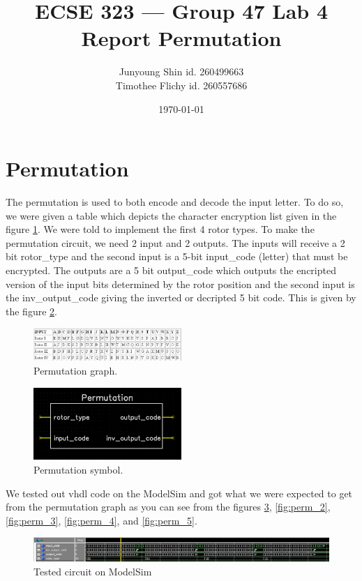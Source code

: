 \documentclass[10pt]{article}
\title{ECSE 323 --- Group 47 Lab 4 Report Permutation}
\author{Junyoung Shin id. 260499663\\ Timothee Flichy id. 260557686}
\date{\today}
\begin{document}
\maketitle
\section{Permutation}
The permutation is used to both encode and decode the input letter. To do so, we were given a table which depicts the character encryption list given in the figure \ref{fig:permuation}. We were told to implement the first 4 rotor types. To make the permutation circuit, we need 2 input and 2 outputs. The inputs will receive a 2 bit rotor\_type and the second input is a 5-bit input\_code (letter) that must be encrypted. The outputs are a 5 bit output\_code which outputs the encripted version of the input bits determined by the rotor position and the second input is the inv\_output\_code giving the inverted or decripted 5 bit code. This is given by the figure \ref{fig:permuation_sym}.
\begin{figure}[!htb]
    \centering
    \includegraphics[width=0.5\textwidth]{./permutation.png}
    \caption{Permutation graph.}
    \label{fig:permuation}
\end{figure}
\begin{figure}[!htb]
    \centering
    \includegraphics[width=0.5\textwidth]{./permutation_circuit.png}
    \caption{Permutation symbol.}
    \label{fig:permuation_sym}
\end{figure}
We tested out vhdl code on the ModelSim and got what we were expected to get from the permutation graph as you can see from the figures \ref{fig:perm_1}, \ref{fig:perm_2}, \ref{fig:perm_3}, \ref{fig:perm_4}, and \ref{fig:perm_5}.
\begin{figure}[!htb]
    \centering
    \includegraphics[width=1\textwidth]{./perm_1.png}
    \caption{Tested circuit on ModelSim}
    \label{fig:perm_1}
\end{figure}
\end{document}
